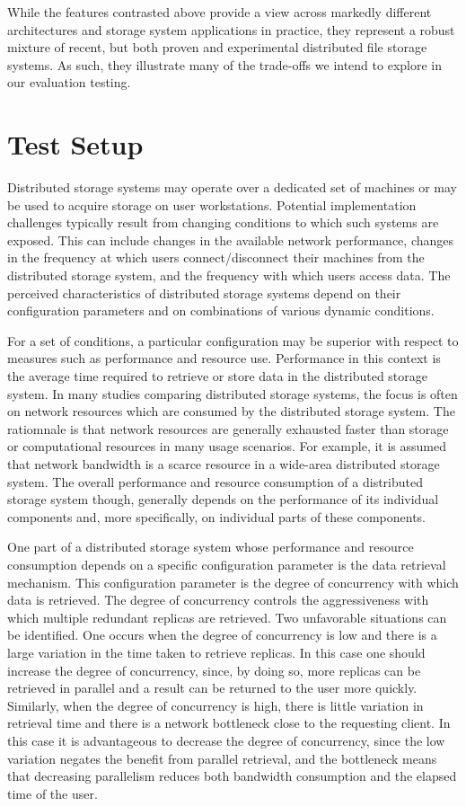 \documentclass[11pt]{article}
\begin{document}
While the features contrasted above provide a view across markedly different 
architectures and storage system applications in practice, they represent a 
robust mixture of recent, but both proven and experimental distributed file 
storage systems. As such, they illustrate many of the trade-offs we intend 
to explore in our evaluation testing.

\section{Test Setup}
Distributed storage systems may operate over a dedicated set of machines 
or may be used to acquire storage on user workstations. Potential 
implementation challenges typically result from changing conditions to 
which such systems are exposed. This can include changes in the 
available network performance, changes in the frequency at which users 
connect/disconnect their machines from the distributed storage system, 
and the frequency with which users access data. The perceived 
characteristics of distributed storage systems depend on their 
configuration parameters and on combinations of various dynamic 
conditions.

For a set of conditions, a particular configuration may be superior with 
respect to measures such as performance and resource use. Performance in 
this context is the average time required to retrieve or store data in the 
distributed storage system. In many studies comparing distributed storage 
systems, the focus is often on network resources which are consumed by the 
distributed storage system. The ratiomnale is that network resources are 
generally exhausted faster than storage or computational resources in many 
usage scenarios. For example, it is assumed that network bandwidth is a 
scarce resource in a wide-area distributed storage system. The overall 
performance and resource consumption of a distributed storage system though, 
generally depends on the performance of its individual components and, more 
specifically, on individual parts of these components.

One part of a distributed storage system whose performance and resource 
consumption depends on a specific configuration parameter is the data 
retrieval mechanism. This configuration parameter is the degree of 
concurrency with which data is retrieved. The degree of concurrency 
controls the aggressiveness with which multiple redundant replicas 
are retrieved. Two unfavorable situations can be identified. One occurs 
when the degree of concurrency is low and there is a large variation in 
the time taken to retrieve replicas. In this case one should increase the 
degree of concurrency, since, by doing so, more replicas can be retrieved 
in parallel and a result can be returned to the user more quickly. 
Similarly, when the degree of concurrency is high, there is little 
variation in retrieval time and there is a network bottleneck close to 
the requesting client. In this case it is advantageous to decrease the 
degree of concurrency, since the low variation negates the benefit from 
parallel retrieval, and the bottleneck means that decreasing parallelism 
reduces both bandwidth consumption and the elapsed time of the user.
\end{document}
